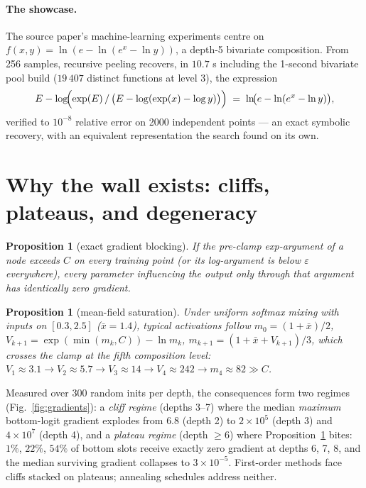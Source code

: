 \documentclass[11pt]{article}
\newtheorem{proposition}[theorem]{Proposition}
\begin{document}
\paragraph{The showcase.} The source paper's machine-learning
experiments centre on $f(x,y) = \ln(e-\ln(e^x-\ln y))$, a depth-5
bivariate composition. From 256 samples, recursive peeling recovers,
in $10.7$ s including the 1-second bivariate pool build
($19\,407$ distinct functions at level 3), the expression
\[
E - \log\!\Bigl(\exp(E)\,/\,\bigl(E - \log(\exp(x) - \log y)\bigr)\Bigr)
\;=\; \ln\!\bigl(e - \ln(e^x - \ln y)\bigr),
\]
verified to $10^{-8}$ relative error on 2000 independent points — an
exact symbolic recovery, with an equivalent representation the search
found on its own.

\section{Why the wall exists: cliffs, plateaus, and degeneracy}
\label{sec:mechanism}

\begin{proposition}[exact gradient blocking]\label{prop:zero}
If the pre-clamp exp-argument of a node exceeds $C$ on every training
point (or its log-argument is below $\varepsilon$ everywhere), every
parameter influencing the output only through that argument has
identically zero gradient.
\end{proposition}

\begin{proposition}[mean-field saturation]\label{prop:meanfield}
Under uniform softmax mixing with inputs on $[0.3,2.5]$
($\bar x = 1.4$), typical activations follow
$m_0=(1+\bar x)/2$, $V_{k+1}=\exp(\min(m_k,C))-\ln m_k$,
$m_{k+1}=(1+\bar x+V_{k+1})/3$, which crosses the clamp at the fifth
composition level: $V_1\!\approx\!3.1 \to V_2\!\approx\!5.7 \to
V_3\!\approx\!14 \to V_4\!\approx\!242 \to m_4\!\approx\!82 \gg C$.
\end{proposition}

Measured over 300 random inits per depth, the consequences form two
regimes (Fig.~\ref{fig:gradients}): a \emph{cliff regime} (depths
3--7) where the median \emph{maximum} bottom-logit gradient explodes
from $6.8$ (depth 2) to $2\times10^{5}$ (depth 3) and $4\times10^{7}$
(depth 4), and a \emph{plateau regime} (depth $\ge6$) where
Proposition~\ref{prop:zero} bites: $1\%$, $22\%$, $54\%$ of bottom
slots receive exactly zero gradient at depths 6, 7, 8, and the median
surviving gradient collapses to $3\times10^{-5}$. First-order methods
face cliffs stacked on plateaus; annealing schedules address neither.
\end{document}
